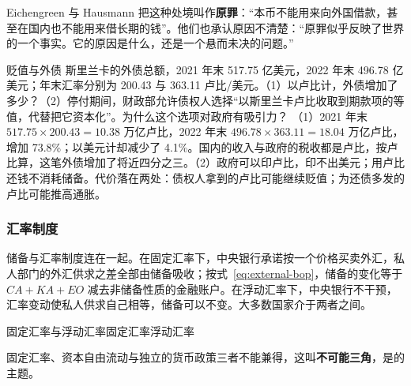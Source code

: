 Eichengreen 与 Hausmann 把这种处境叫作\textbf{原罪}：“本币不能用来向外国借款，甚至在国内也不能用来借长期的钱”\cite{eichengreen1999}。他们也承认原因不清楚：“原罪似乎反映了世界的一个事实。它的原因是什么，还是一个悬而未决的问题。”\cite{eichengreen1999}

\begin{example}{贬值与外债}\label{ex:external-sin}
斯里兰卡的外债总额，2021 年末 517.75 亿美元，2022 年末 496.78 亿美元；年末汇率分别为 200.43 与 363.11 卢比/美元\cite{cbsl2023ar}。（1）以卢比计，外债增加了多少？（2）停付期间，财政部允许债权人选择“以斯里兰卡卢比收取到期款项的等值，代替把它资本化”\cite{lktreasury2022}。为什么这个选项对政府有吸引力？
\solution （1）2021 年末 $517.75\times200.43=10.38$ 万亿卢比，2022 年末 $496.78\times363.11=18.04$ 万亿卢比，增加 73.8\%；以美元计却减少了 4.1\%。国内的收入与政府的税收都是卢比，按卢比算，这笔外债增加了将近四分之三。（2）政府可以印卢比，印不出美元；用卢比还钱不消耗储备。代价落在两处：债权人拿到的卢比可能继续贬值；为还债多发的卢比可能推高通胀。
\end{example}

\subsubsection{汇率制度}
储备与汇率制度连在一起。在固定汇率下，中央银行承诺按一个价格买卖外汇，私人部门的外汇供求之差全部由储备吸收；按式~\eqref{eq:external-bop}，储备的变化等于 $\mathit{CA}+\mathit{KA}+\mathit{EO}$ 减去非储备性质的金融账户。在浮动汇率下，中央银行不干预，汇率变动使私人供求自己相等，储备可以不变。大多数国家介于两者之间。

\begin{compare}{固定汇率与浮动汇率}{固定汇率}{浮动汇率}
\end{compare}

固定汇率、资本自由流动与独立的货币政策三者不能兼得，这叫\textbf{不可能三角}，是的主题。

